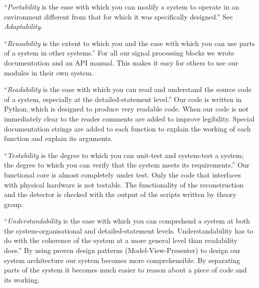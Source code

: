 \documentclass[a4paper, openany, oneside]{memoir}
\begin{document}
``\textit{Portability} is the ease with which you can modify a system to operate in an environment different from that for which it was specifically designed.'' See \textit{Adaptability}.

``\textit{Reusability} is the extent to which you and the ease with which you can use parts of a system in other systems.'' For all our signal processing blocks we wrote documentation and an API manual. This makes it easy for others to use our modules in their own system.

``\textit{Readability} is the ease with which you can read and understand the source code of a system, especially at the detailed-statement level.'' Our code is written in Python, which is designed to produce very readable code. When our code is not immediately clear to the reader comments are added to improve legibility. Special documentation strings are added to each function to explain the working of each function and explain its arguments.

``\textit{Testability} is the degree to which you can unit-test and system-test a system; the degree to which you can verify that the system meets its requirements.'' Our functional core is almost completely under test. Only the code that interfaces with physical hardware is not testable. The functionality of the reconstruction and the detector is checked with the output of the \matlab{} scripts written by theory group.

``\textit{Understandability} is the ease with which you can comprehend a system at both the system-organisational and detailed-statement levels. Understandability has to do with the coherence of the system at a more general level than readability does.'' By using proven design patterns (Model-View-Presenter) to design our system architecture our system becomes more comprehensible. By separating parts of the system it becomes much easier to reason about a piece of code and its working.
\end{document}
